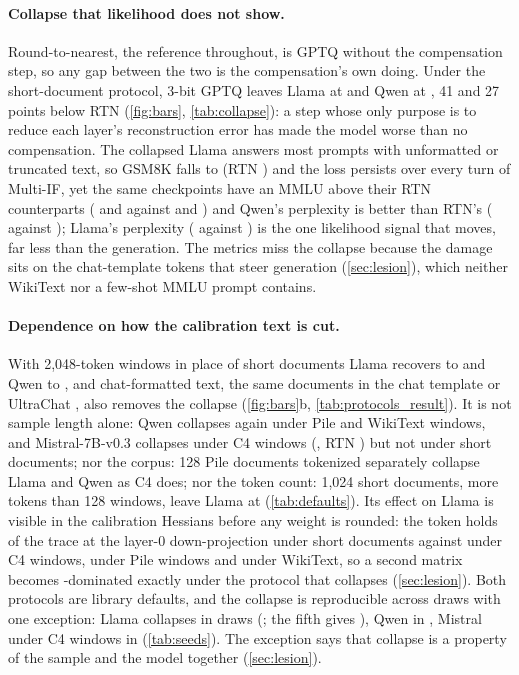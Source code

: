 \paragraph{Collapse that likelihood does not show.}
Round-to-nearest, the reference throughout, is GPTQ without the compensation step, so any gap between the two is the compensation's own doing.
Under the short-document protocol, 3-bit GPTQ leaves Llama at \LgptqIF{} and Qwen at \QgptqIF{}, 41 and 27 points below RTN (\cref{fig:bars}, \cref{tab:collapse}): a step whose only purpose is to reduce each layer's reconstruction error has made the model worse than no compensation.
The collapsed Llama answers most prompts with unformatted or truncated text, so GSM8K falls to \LgptqGSM{} (RTN \LrtnGSM{}) and the loss persists over every turn of Multi-IF, yet the same checkpoints have an MMLU above their RTN counterparts (\LgptqMMLU{} and \QgptqMMLU{} against \LrtnMMLU{} and \QrtnMMLU{}) and Qwen's perplexity is better than RTN's (\QgptqPPL{} against \QrtnPPL{}); Llama's perplexity (\LgptqPPL{} against \LrtnPPL{}) is the one likelihood signal that moves, far less than the generation.
The metrics miss the collapse because the damage sits on the chat-template tokens that steer generation (\cref{sec:lesion}), which neither WikiText nor a few-shot MMLU prompt contains.

\paragraph{Dependence on how the calibration text is cut.}
With 2,048-token windows in place of short documents Llama recovers to \LcwinIF{} and Qwen to \QcwinIF{}, and chat-formatted text, the same documents in the chat template or UltraChat \citep{ding2023ultrachat}, also removes the collapse (\cref{fig:bars}b, \cref{tab:protocols_result}).
It is not sample length alone: Qwen collapses again under Pile and WikiText windows, and Mistral-7B-v0.3 collapses under C4 windows (\MgptqIF{}, RTN \MrtnIF{}) but not under short documents; nor the corpus: 128 Pile documents tokenized separately collapse Llama and Qwen as C4 does; nor the token count: 1,024 short documents, more tokens than 128 windows, leave Llama at \LgptqLibIF{} (\cref{tab:defaults}).
Its effect on Llama is visible in the calibration Hessians before any weight is rounded: the \bos{} token holds \AbosZero{} of the trace at the layer-0 down-projection under short documents against \AbosZeroWin{} under C4 windows, \AbosZeroPile{} under Pile windows and \AbosZeroWiki{} under WikiText, so a second matrix becomes \bos{}-dominated exactly under the protocol that collapses (\cref{sec:lesion}).
Both protocols are library defaults, and the collapse is reproducible across draws with one exception: Llama collapses in \LcollapseFreq{} draws (\LseedRange{}; the fifth gives \LgptqSeedIF{}), Qwen in \QcollapseFreq{}, Mistral under C4 windows in \McollapseFreq{} (\cref{tab:seeds}).
The exception says that collapse is a property of the sample and the model together (\cref{sec:lesion}).
